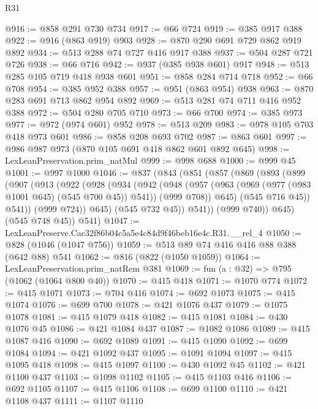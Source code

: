 \begin{lexlean}{R31}
\begin{coremodule}
@916 := @858 @291 @730 @734
@917 := @66 @724
@919 := @385 @917 @388
@922 := @916 (@863 @919) @903
@928 := @870 @290 @691 @729 @862 @919 @892
@934 := @513 @288 @74 @727 @416 @917 @388
@937 := @504 @287 @721 @726
@938 := @66 @716
@942 := @937 (@385 @938 @601) @917
@948 := @513 @285 @105 @719 @418 @938 @601
@951 := @858 @284 @714 @718
@952 := @66 @708
@954 := @385 @952 @388
@957 := @951 (@863 @954) @938
@963 := @870 @283 @691 @713 @862 @954 @892
@969 := @513 @281 @74 @711 @416 @952 @388
@972 := @504 @280 @705 @710
@973 := @66 @700
@974 := @385 @973
@977 := @972 (@974 @601) @952
@978 := @513 @209
@983 := @978 @105 @703 @418 @973 @601
@986 := @858 @208 @693 @702
@987 := @863 @601
@997 := @986 @987 @973 (@870 @105 @691 @418 @862 @601 @892 @645)
@998 := LexLeanPreservation.prim_natMul
@999 := @998 @688
@1000 := @999 @45
@1001 := @997 @1000
@1046 := @837
    (@843
      (@851
        (@857
          (@869
            (@893
              (@899
                (@907
                  (@913
                    (@922
                      (@928
                        (@934
                          (@942
                            (@948
                              (@957
                                (@963 (@969 (@977 (@983 @1001 @645) (@545 @700 @45)) @541))
                                (@999 @708))
                              @645)
                            (@545 @716 @45))
                          @541))
                      (@999 @724))
                    @645)
                  (@545 @732 @45))
                @541))
            (@999 @740))
          @645)
        (@545 @748 @45))
      @541)
@1047 := LexLeanPreserve.Cac32f86b04c5a5e4c84d9f46beb16e4c.R31.__rel_4
@1050 := @828 (@1046 (@1047 @756))
@1059 := @513 @89 @74 @416 @416 @88 @388 (@642 @88) @541
@1062 := @816 (@822 (@1050 @1059))
@1064 := LexLeanPreservation.prim_natRem @381
@1069 := fun (a : @32) => @795 (@1062 (@1064 @800 @40))
@1070 := @415 @418
@1071 := @1070 @774
@1072 := @415 @1071
@1073 := @704 @416
@1074 := @692 @1073
@1075 := @415 @1074
@1076 := @699 @700
@1078 := @421 @1076 @437
@1079 := @1075 @1078
@1081 := @415 @1079 @418
@1082 := @415 @1081
@1084 := @430 @1076 @45
@1086 := @421 @1084 @437
@1087 := @1082 @1086
@1089 := @415 @1087 @416
@1090 := @692 @1089
@1091 := @415 @1090
@1092 := @699 @1084
@1094 := @421 @1092 @437
@1095 := @1091 @1094
@1097 := @415 @1095 @418
@1098 := @415 @1097
@1100 := @430 @1092 @45
@1102 := @421 @1100 @437
@1103 := @1098 @1102
@1105 := @415 @1103 @416
@1106 := @692 @1105
@1107 := @415 @1106
@1108 := @699 @1100
@1110 := @421 @1108 @437
@1111 := @1107 @1110

\end{coremodule}
\end{lexlean}
